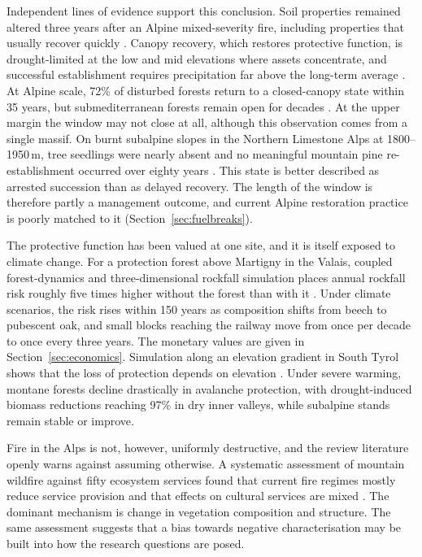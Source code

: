 \documentclass[11pt,a4paper]{article}
\begin{document}
Independent lines of evidence support this conclusion. Soil properties remained altered three years after an Alpine mixed-severity fire, including properties that usually recover quickly \citep{negri_wildfire_2026}. Canopy recovery, which restores protective function, is drought-limited at the low and mid elevations where assets concentrate, and successful establishment requires precipitation far above the long-term average \citep{moser_potential_2010}. At Alpine scale, 72\% of disturbed forests return to a closed-canopy state within 35 years, but submediterranean forests remain open for decades \citep{stritih_alternative_2023}. At the upper margin the window may not close at all, although this observation comes from a single massif. On burnt subalpine slopes in the Northern Limestone Alps at 1800--1950\,m, tree seedlings were nearly absent and no meaningful mountain pine re-establishment occurred over eighty years \citep{degiuli_arrested_2024}. This state is better described as arrested succession than as delayed recovery. The length of the window is therefore partly a management outcome, and current Alpine restoration practice is poorly matched to it (Section~\ref{sec:fuelbreaks}).

The protective function has been valued at one site, and it is itself exposed to climate change. For a protection forest above Martigny in the Valais, coupled forest-dynamics and three-dimensional rockfall simulation places annual rockfall risk roughly five times higher without the forest than with it \citep{moos_climate_2021}. Under climate scenarios, the risk rises within 150 years as composition shifts from beech to pubescent oak, and small blocks reaching the railway move from once per decade to once every three years. The monetary values are given in Section~\ref{sec:economics}. Simulation along an elevation gradient in South Tyrol shows that the loss of protection depends on elevation \citep{hillebrand_contrasting_2023}. Under severe warming, montane forests decline drastically in avalanche protection, with drought-induced biomass reductions reaching 97\% in dry inner valleys, while subalpine stands remain stable or improve.

Fire in the Alps is not, however, uniformly destructive, and the review literature openly warns against assuming otherwise. A systematic assessment of mountain wildfire against fifty ecosystem services found that current fire regimes mostly reduce service provision and that effects on cultural services are mixed \citep{vukomanovic_systematic_2019}. The dominant mechanism is change in vegetation composition and structure. The same assessment suggests that a bias towards negative characterisation may be built into how the research questions are posed.
\end{document}
